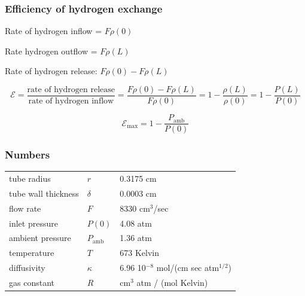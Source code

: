 \documentclass[10pt]{beamer}
\newcommand{\Pu}{P_{\mathrm{amb}}}
\begin{document}
\begin{frame}
  \frametitle{Efficiency of hydrogen exchange}

Rate of hydrogen inflow = $F\rho(0)$
\medskip

Rate hydrogen outflow = $F\rho(L)$
\medskip

Rate of hydrogen release: $F\rho(0) - F\rho(L)$

\bigskip
\bigskip

\[
\mathcal{E}
  = \frac
    {\text{rate of hydrogen release}}
    {\text{rate of hydrogen inflow}}
  = \frac{F\rho(0) - F\rho(L)}{F\rho(0)}
  = 1 - \frac{\rho(L)}{\rho(0)}
  = 1 - \frac{P(L)}{P(0)}
\]
\bigskip

\[
  \mathcal{E}_{\max} = 1 - \frac{\Pu}{P(0)}
\]

\end{frame}

\begin{frame}
  \frametitle{Numbers}

\renewcommand{\arraystretch}{1.7}
\begin{tabular}{lll}
  tube radius & $r$ & 0.3175 cm \\
  tube wall thickness & $\delta$ & 0.0003 cm \\
  flow rate & $F$ & 8330 cm$^3$/sec \\
  inlet pressure & $P(0)$ & 4.08 atm \\
  ambient pressure & $\Pu$ & 1.36 atm \\
  temperature & $T$ & 673 Kelvin \\
  diffusivity & $\kappa$ & 6.96 10$^{-8}$ mol/(cm sec atm$^{1/2}$) \\
  gas constant & $R$ & cm$^3$ atm / (mol Kelvin)
\end{tabular}

\end{frame}
\end{document}
